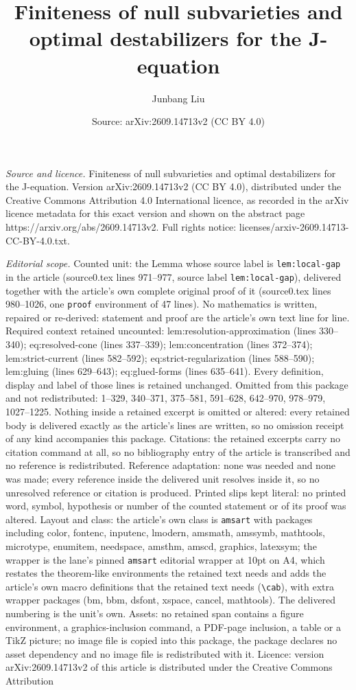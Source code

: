 \documentclass[10pt,a4paper]{amsart}
\title[Finiteness of null subvarieties and optimal destabilizers fo]{Finiteness of null subvarieties and optimal destabilizers for the J-equation}
\author{Junbang Liu}
\date{Source: arXiv:2609.14713v2 (CC BY 4.0)}
\begin{document}
\maketitle

\noindent\emph{Source and licence.} Finiteness of null subvarieties and optimal destabilizers for the J-equation. Version arXiv:2609.14713v2 (CC BY 4.0), distributed under the Creative Commons Attribution 4.0 International licence, as recorded in the arXiv licence metadata for this exact version and shown on the abstract page https://arxiv.org/abs/2609.14713v2. Full rights notice: licenses/arxiv-2609.14713-CC-BY-4.0.txt.\par\smallskip

\noindent\textit{Editorial scope.} Counted unit: the Lemma whose source label is \texttt{lem:local-gap} in the article (source0.tex lines 971--977, source label \texttt{lem:local-gap}), delivered together with the article's own complete original proof of it (source0.tex lines 980--1026, one \texttt{proof} environment of 47 lines). No mathematics is written, repaired or re-derived: statement and proof are the article's own text line for line. Required context retained uncounted: lem:resolution-approximation (lines 330--340); eq:resolved-cone (lines 337--339); lem:concentration (lines 372--374); lem:strict-current (lines 582--592); eq:strict-regularization (lines 588--590); lem:gluing (lines 629--643); eq:glued-forms (lines 635--641). Every definition, display and label of those lines is retained unchanged. Omitted from this package and not redistributed: 1--329, 340--371, 375--581, 591--628, 642--970, 978--979, 1027--1225. Nothing inside a retained excerpt is omitted or altered: every retained body is delivered exactly as the article's lines are written, so no omission receipt of any kind accompanies this package. Citations: the retained excerpts carry no citation command at all, so no bibliography entry of the article is transcribed and no reference is redistributed. Reference adaptation: none was needed and none was made; every reference inside the delivered unit resolves inside it, so no unresolved reference or citation is produced. Printed slips kept literal: no printed word, symbol, hypothesis or number of the counted statement or of its proof was altered. Layout and class: the article's own class is \texttt{amsart} with packages including color, fontenc, inputenc, lmodern, amsmath, amssymb, mathtools, microtype, enumitem, needspace, amsthm, amscd, graphics, latexsym; the wrapper is the lane's pinned \texttt{amsart} editorial wrapper at 10pt on A4, which restates the theorem-like environments the retained text needs and adds the article's own macro definitions that the retained text needs (\texttt{\textbackslash cab}), with extra wrapper packages (bm, bbm, dsfont, xspace, cancel, mathtools). The delivered numbering is the unit's own. Assets: no retained span contains a figure environment, a graphics-inclusion command, a PDF-page inclusion, a table or a TikZ picture; no image file is copied into this package, the package declares no asset dependency and no image file is redistributed with it. Licence: version arXiv:2609.14713v2 of this article is distributed under the Creative Commons Attribution 
\end{document}
